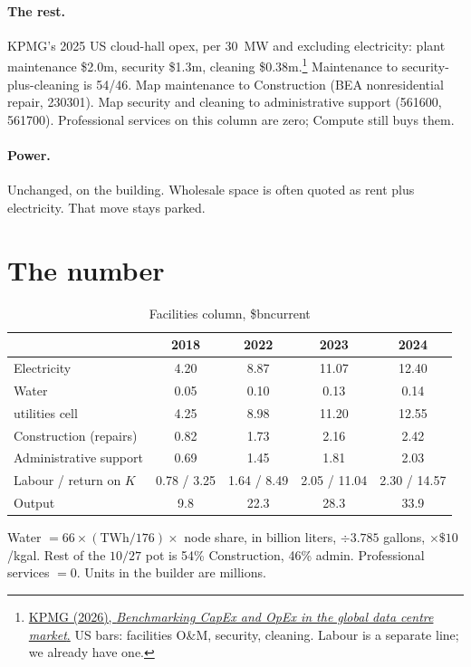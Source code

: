 \documentclass[11pt]{article}
\newcommand{\bn}{\$bn}
\begin{document}
\paragraph{The rest.}
KPMG's 2025 US cloud-hall opex, per 30~MW and excluding electricity: plant maintenance \$2.0m, security \$1.3m, cleaning \$0.38m.\footnote{\href{https://assets.kpmg.com/content/dam/kpmgsites/sg/pdf/2026/05/benchmarking-capex-and-opex-in-the-global-data-centre-market.pdf}{KPMG (2026), \emph{Benchmarking CapEx and OpEx in the global data centre market}.} US bars: facilities O\&M, security, cleaning. Labour is a separate line; we already have one.} Maintenance to security-plus-cleaning is 54/46. Map maintenance to Construction (BEA nonresidential repair, 230301). Map security and cleaning to administrative support (561600, 561700). Professional services on this column are zero; Compute still buys them.

\paragraph{Power.}
Unchanged, on the building. Wholesale space is often quoted as rent plus electricity. That move stays parked.

\section{The number}

\begin{table}[ht]
\centering
\begin{threeparttable}
\caption{Facilities column, \bn current}
\label{tab:col}
\begin{tabular}{lcccc}
\toprule
 & 2018 & 2022 & 2023 & 2024 \\
\midrule
Electricity & 4.20 & 8.87 & 11.07 & 12.40 \\
Water & 0.05 & 0.10 & 0.13 & 0.14 \\
\quad utilities cell & 4.25 & 8.98 & 11.20 & 12.55 \\
Construction (repairs) & 0.82 & 1.73 & 2.16 & 2.42 \\
Administrative support & 0.69 & 1.45 & 1.81 & 2.03 \\
Labour / return on $K$ & 0.78 / 3.25 & 1.64 / 8.49 & 2.05 / 11.04 & 2.30 / 14.57 \\
Output & 9.8 & 22.3 & 28.3 & 33.9 \\
\bottomrule
\end{tabular}
\begin{tablenotes}\footnotesize
\item Water $= 66\times(\mathrm{TWh}/176)\times$ node share, in billion liters, $\div 3.785$ gallons, $\times\$10$/kgal. Rest of the $10/27$ pot is 54\% Construction, 46\% admin. Professional services $=0$. Units in the builder are millions.
\end{tablenotes}
\end{threeparttable}
\end{table}
\end{document}
